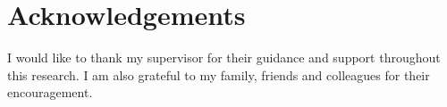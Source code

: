 \chapter*{Acknowledgements}

I would like to thank my supervisor for their guidance and support throughout this research. I am also grateful to my family, friends and colleagues for their encouragement.

